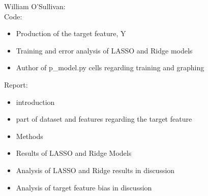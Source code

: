 \vspace{16pt}

William O'Sullivan:\\

Code:
\begin{itemize}
    \item Production of the target feature, Y
    \item Training and error analysis of LASSO and Ridge models
    \item Author of p\_model.py cells regarding training and graphing
\end{itemize}

Report:
\begin{itemize}
    \item introduction
    \item part of dataset and features regarding the target feature
    \item Methods
    \item Results of LASSO and Ridge Models
    \item Analysis of LASSO and Ridge results in discussion
    \item Analysis of target feature bias in discussion
\end{itemize}
